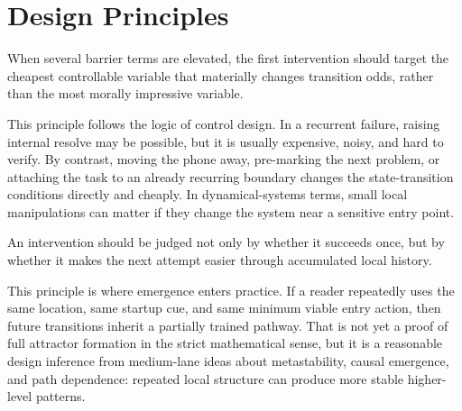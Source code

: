 \section{Design Principles}

\begin{proposition}
When several barrier terms are elevated, the first intervention should target
the cheapest controllable variable that materially changes transition odds,
rather than the most morally impressive variable.
\end{proposition}

\begin{discussion}
This principle follows the logic of control design. In a recurrent failure,
raising internal resolve may be possible, but it is usually expensive, noisy,
and hard to verify. By contrast, moving the phone away, pre-marking the next
problem, or attaching the task to an already recurring boundary changes the
state-transition conditions directly and cheaply. In dynamical-systems terms,
small local manipulations can matter if they change the system near a sensitive
entry point.
\end{discussion}

\begin{proposition}
An intervention should be judged not only by whether it succeeds once, but by
whether it makes the next attempt easier through accumulated local history.
\end{proposition}

\begin{discussion}
This principle is where emergence enters practice. If a reader repeatedly uses
the same location, same startup cue, and same minimum viable entry action, then
future transitions inherit a partially trained pathway. That is not yet a proof
of full attractor formation in the strict mathematical sense, but it is a
reasonable design inference from medium-lane ideas about metastability, causal
emergence, and path dependence: repeated local structure can produce more
stable higher-level patterns.
\end{discussion}
